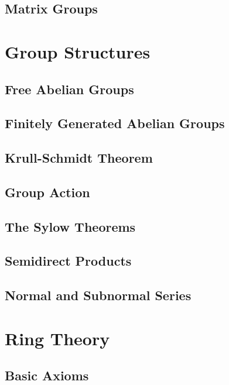 \documentclass[a4paper,8pt]{article}
\theoremstyle{theorem}
\begin{document}
\subsection{Matrix Groups}


\newpage

\section{Group Structures}

\subsection{Free Abelian Groups}

\subsection{Finitely Generated Abelian Groups}

\subsection{Krull-Schmidt Theorem}

\subsection{Group Action}

\subsection{The Sylow Theorems}

\subsection{Semidirect Products}

\subsection{Normal and Subnormal Series}

\newpage

\section{Ring Theory}

\subsection{Basic Axioms}
\end{document}
